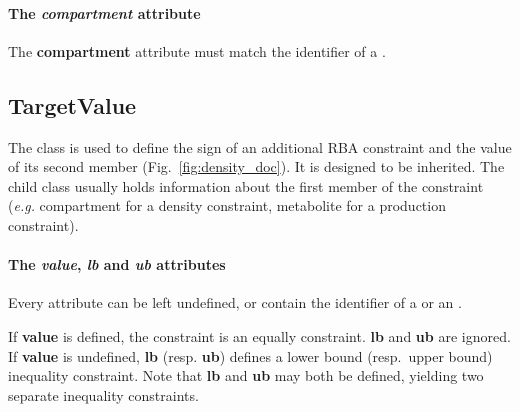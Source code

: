 \paragraph{The \textit{compartment} attribute}
The \textbf{compartment} attribute must match the identifier of a \compartment.


\subsection{TargetValue}
\label{sec:target_value}

The \targetvalue{} class is used to define the sign of an additional RBA
constraint and the value of its second member
(Fig.~\ref{fig:density_doc}).
It is designed to be inherited.
The child class usually holds information about the first member of the
constraint
(\textit{e.g.} compartment for a density constraint,
metabolite for a production constraint).

\paragraph{The \textit{value}, \textit{lb} and \textit{ub} attributes}
Every attribute can be left undefined, or
contain the identifier of a \function{} or an \aggregate.

If \textbf{value} is defined, the constraint is an equally constraint.
\textbf{lb} and \textbf{ub} are ignored.
If \textbf{value} is undefined, \textbf{lb} (resp. \textbf{ub}) defines
a lower bound (resp.\ upper bound) inequality constraint.
Note that \textbf{lb} and \textbf{ub} may both be defined, yielding two
separate inequality constraints.
